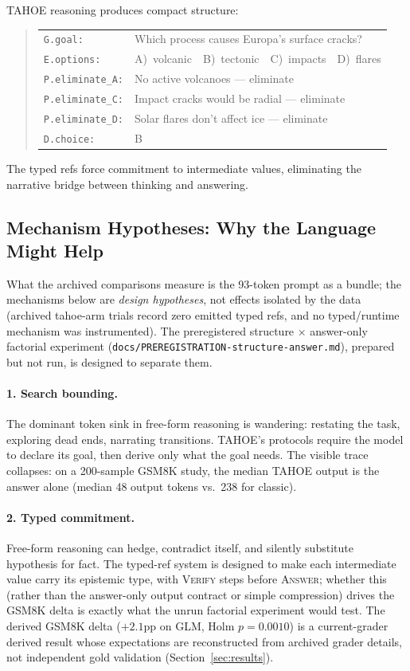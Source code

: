 \documentclass[11pt,a4paper]{article}
\begin{document}
TAHOE reasoning produces compact structure:
\begin{quote}
\small
\begin{tabular}{ll}
\texttt{G.goal:} & Which process causes Europa's surface cracks? \\
\texttt{E.options:} & A)~volcanic~~B)~tectonic~~C)~impacts~~D)~flares \\
\texttt{P.eliminate\_A:} & No active volcanoes --- eliminate \\
\texttt{P.eliminate\_C:} & Impact cracks would be radial --- eliminate \\
\texttt{P.eliminate\_D:} & Solar flares don't affect ice --- eliminate \\
\texttt{D.choice:} & B \\
\end{tabular}
\end{quote}

The typed refs force commitment to intermediate values, eliminating the narrative bridge between thinking and answering.

\subsection{Mechanism Hypotheses: Why the Language Might Help}
\label{subsec:mechanism}

What the archived comparisons measure is the 93-token prompt as a bundle;
the mechanisms below are \emph{design hypotheses}, not effects isolated by
the data (archived tahoe-arm trials record zero emitted typed refs, and no
typed/runtime mechanism was instrumented). The preregistered structure
$\times$ answer-only factorial experiment
(\texttt{docs/PREREGISTRATION-structure-answer.md}), prepared but not run,
is designed to separate them.

\paragraph{1. Search bounding.}
The dominant token sink in free-form reasoning is wandering: restating the task, exploring dead ends, narrating transitions. TAHOE's protocols require the model to declare its goal, then derive only what the goal needs. The visible trace collapses: on a 200-sample GSM8K study, the median TAHOE output is the answer alone (median 48 output tokens vs.\ 238 for classic).

\paragraph{2. Typed commitment.}
Free-form reasoning can hedge, contradict itself, and silently substitute hypothesis for fact. The typed-ref system is designed to make each intermediate value carry its epistemic type, with \textsc{Verify} steps before \textsc{Answer}; whether this (rather than the answer-only output contract or simple compression) drives the GSM8K delta is exactly what the unrun factorial experiment would test. The derived GSM8K delta ($+2.1$pp on GLM, Holm $p=0.0010$) is a current-grader derived result whose expectations are reconstructed from archived grader details, not independent gold validation (Section~\ref{sec:results}).
\end{document}
